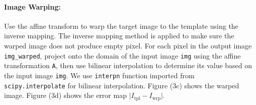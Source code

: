 \documentclass[11pt]{scrartcl}
\begin{document}
\paragraph{\textbf{Image Warping:}}
Use the affine transform to warp the target image to the template using the inverse mapping. The inverse mapping method is applied to make sure the warped image does not produce empty pixel. For each pixel in the output image \texttt{img\_warped}, project onto the domain of the input image \texttt{img} using the affine transformation \texttt{A}, then use bilinear interpolation to determine its value based on the input image \texttt{img}. We use \texttt{interpn} function imported from \texttt{scipy.interpolate} for bilinear interpolation. Figure (3c) shows the warped image. Figure (3d) shows the error map $\vert I_{\text{tpl}}-I_\text{wrp}\vert$.




\begin{figure}[H]
	\captionsetup[subfigure]{labelformat=empty}
	\centering
\end{figure}
\end{document}
